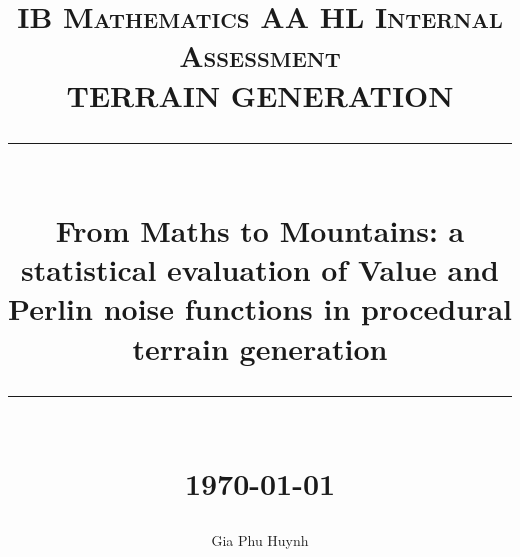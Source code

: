 \documentclass[10pt]{article}
\title{ 
    \normalsize \textsc{IB Mathematics AA HL Internal Assessment} \\ [2.5cm]

	\LARGE TERRAIN GENERATION
	\rule{\linewidth}{0.5pt} \\
	\Large \textbf{From Maths to Mountains: a statistical evaluation of Value and Perlin noise functions in procedural terrain generation}
	\rule{\linewidth}{1pt} \\ [1cm]
	\normalsize \today \vspace*{5\baselineskip}
}
\date{}
\author{Gia Phu Huynh}
\begin{document}
\begin{titlepage}
	\maketitle
	\thispagestyle{empty}
\end{titlepage}

\pagebreak
\raggedright


\raggedright


\raggedright


\nopagebreak
\raggedright


\raggedright


\raggedright

\end{document}

